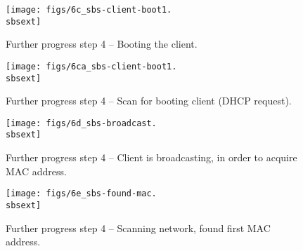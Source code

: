 \begin{figure}[htbp]
  \begin{center}
    \texttt{[image: figs/6c\_sbs-client-boot1.\\sbsext]}
    \caption{Further progress step 4 -- Booting the client.}
    \label{fig:sbs-collect-boot1}
  \end{center}
\end{figure}

\clearpage

\begin{figure}[htbp]
  \begin{center}
    \texttt{[image: figs/6ca\_sbs-client-boot1.\\sbsext]}
    \caption{Further progress step 4 -- Scan for booting client (DHCP request).}
    \label{fig:sbs-client-boot2}
  \end{center}
\end{figure}


%


\begin{figure}[htbp]
  \begin{center}
    \texttt{[image: figs/6d\_sbs-broadcast.\\sbsext]}
    \caption{Further progress step 4 -- Client is broadcasting, in order to acquire MAC address.}
    \label{fig:sbs-collect-broadcast}
  \end{center}
\end{figure}






\begin{figure}[htbp]
  \begin{center}
    \texttt{[image: figs/6e\_sbs-found-mac.\\sbsext]}
    \caption{Further progress step 4 -- Scanning network, found first MAC address.}
    \label{fig:sbs-setup-network2}
  \end{center}
\end{figure}



